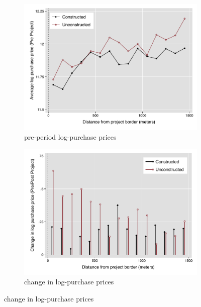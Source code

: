 \documentclass[12pt]{article}
\begin{document}
\begin{figure}[t!]
        \centering
        \caption[ House Prices outside Constructed and Unconstructed Projects Areas ]
        {\small House Prices outside Constructed and Unconstructed projects } 
        \begin{subfigure}[b]{0.495\textwidth}
            \centering
            \includegraphics[width=\textwidth,trim={0.9cm .3cm 0.1cm 0cm}, clip=true]{figures/price_pre_means_4}
            \caption[Network2]%
            {{\small pre-period log-purchase prices }}    
            \label{fig:preprice}
        \end{subfigure}
        \hfill
        \begin{subfigure}[b]{0.495\textwidth}   
            \centering 
            \includegraphics[width=\textwidth,trim={0.9cm .3cm 0.1cm 0cm}, clip=true]{figures/price_rawchanges_4}
            \caption[]%
            {{\small change in log-purchase prices}}    
            \label{fig:changeprice}
        \end{subfigure}
        \label{fig:rawpricemeans}
        \vspace{-6mm}
\end{figure} 
\end{document}

